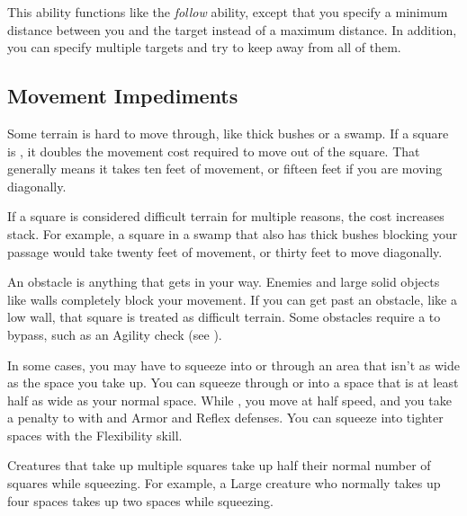         \begin{freeability}{}
            This ability functions like the \textit{follow} ability, except that you specify a minimum distance between you and the target instead of a maximum distance.
            In addition, you can specify multiple targets and try to keep away from all of them.
        \end{freeability}

    \subsection{Movement Impediments}

        \label{Difficult Terrain}
        Some terrain is hard to move through, like thick bushes or a swamp.
        If a square is , it doubles the movement cost required to move out of the square.
        That generally means it takes ten feet of movement, or fifteen feet if you are moving diagonally.

        If a square is considered difficult terrain for multiple reasons, the cost increases stack.
        For example, a square in a swamp that also has thick bushes blocking your passage would take twenty feet of movement, or thirty feet to move diagonally.

        An obstacle is anything that gets in your way. Enemies and large solid objects like walls completely block your movement. If you can get past an obstacle, like a low wall, that square is treated as difficult terrain. Some obstacles require a  to bypass, such as an Agility check (see ).

        \label{Squeezing}
        In some cases, you may have to squeeze into or through an area that isn't as wide as the space you take up.
        You can squeeze through or into a space that is at least half as wide as your normal space.
        While , you move at half speed, and you take a  penalty to  with  and Armor and Reflex defenses.
        You can squeeze into tighter spaces with the Flexibility skill.

        Creatures that take up multiple squares take up half their normal number of squares while squeezing. For example, a Large creature who normally takes up four spaces takes up two spaces while squeezing.

